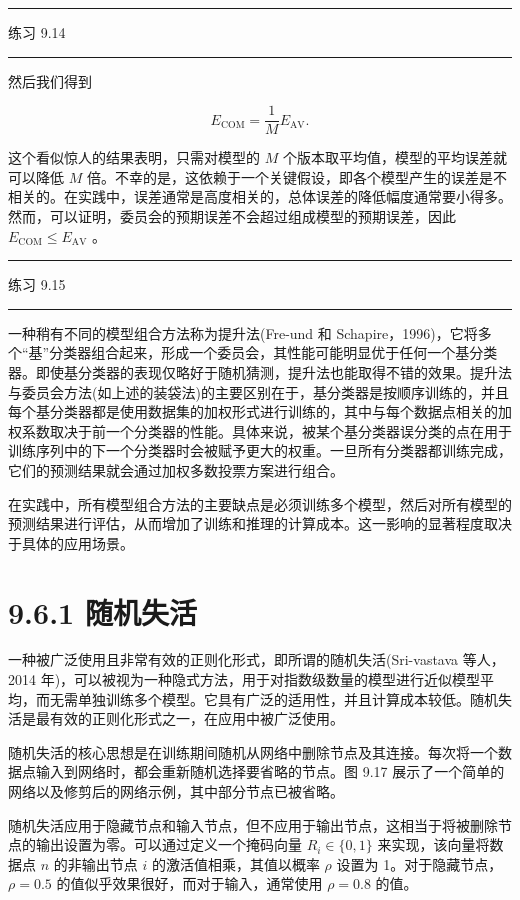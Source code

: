\documentclass[10pt]{report}
\newcommand{\HRule}{\begin{center}\rule{0.9\linewidth}{0.2mm}\end{center}}
\begin{document}
\HRule

练习 9.14

\HRule

然后我们得到

\[
{E}_{\mathrm{{COM}}} = \frac{1}{M}{E}_{\mathrm{{AV}}}. \tag{9.50}
\]

这个看似惊人的结果表明，只需对模型的 \(M\) 个版本取平均值，模型的平均误差就可以降低 \(M\) 倍。不幸的是，这依赖于一个关键假设，即各个模型产生的误差是不相关的。在实践中，误差通常是高度相关的，总体误差的降低幅度通常要小得多。然而，可以证明，委员会的预期误差不会超过组成模型的预期误差，因此 \({E}_{\mathrm{{COM}}} \leq  {E}_{\mathrm{{AV}}}\) 。

\HRule

练习 9.15

\HRule

一种稍有不同的模型组合方法称为提升法(Fre-und 和 Schapire，1996)，它将多个“基”分类器组合起来，形成一个委员会，其性能可能明显优于任何一个基分类器。即使基分类器的表现仅略好于随机猜测，提升法也能取得不错的效果。提升法与委员会方法(如上述的装袋法)的主要区别在于，基分类器是按顺序训练的，并且每个基分类器都是使用数据集的加权形式进行训练的，其中与每个数据点相关的加权系数取决于前一个分类器的性能。具体来说，被某个基分类器误分类的点在用于训练序列中的下一个分类器时会被赋予更大的权重。一旦所有分类器都训练完成，它们的预测结果就会通过加权多数投票方案进行组合。

在实践中，所有模型组合方法的主要缺点是必须训练多个模型，然后对所有模型的预测结果进行评估，从而增加了训练和推理的计算成本。这一影响的显著程度取决于具体的应用场景。

\section*{9.6.1 随机失活}

一种被广泛使用且非常有效的正则化形式，即所谓的随机失活(Sri-vastava 等人，2014 年)，可以被视为一种隐式方法，用于对指数级数量的模型进行近似模型平均，而无需单独训练多个模型。它具有广泛的适用性，并且计算成本较低。随机失活是最有效的正则化形式之一，在应用中被广泛使用。

随机失活的核心思想是在训练期间随机从网络中删除节点及其连接。每次将一个数据点输入到网络时，都会重新随机选择要省略的节点。图 9.17 展示了一个简单的网络以及修剪后的网络示例，其中部分节点已被省略。

随机失活应用于隐藏节点和输入节点，但不应用于输出节点，这相当于将被删除节点的输出设置为零。可以通过定义一个掩码向量 \({R}_{i} \in  \{ 0,1\}\) 来实现，该向量将数据点 \(n\) 的非输出节点 \(i\) 的激活值相乘，其值以概率 \(\rho\) 设置为 1。对于隐藏节点， \(\rho  = {0.5}\) 的值似乎效果很好，而对于输入，通常使用 \(\rho  = {0.8}\) 的值。
\end{document}

